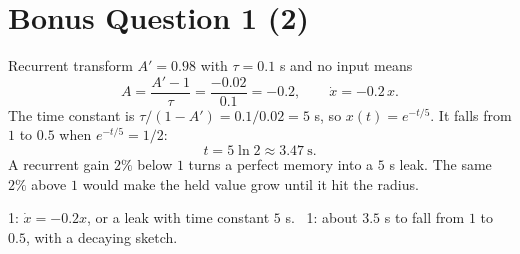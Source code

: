 \documentclass[11pt,letterpaper]{article}
\begin{document}
\section*{Bonus Question 1 \hfill (2)}
Recurrent transform $A' = 0.98$ with $\tau = 0.1$ s and no input means
\[
A = \frac{A' - 1}{\tau} = \frac{-0.02}{0.1} = -0.2,
\qquad \dot x = -0.2\,x.
\]
The time constant is $\tau/(1 - A') = 0.1/0.02 = 5$ s, so $x(t) = e^{-t/5}$. It falls from $1$ to $0.5$ when $e^{-t/5} = 1/2$:
\[
t = 5\ln 2 \approx \mathbf{3.47}\ \text{s}.
\]
A recurrent gain $2\%$ below $1$ turns a perfect memory into a $5$ s leak. The same $2\%$ above $1$ would make the held value grow until it hit the radius.
\begin{center}
\end{center}
\begin{marking}
1: $\dot x = -0.2x$, or a leak with time constant $5$ s. \ 1: about $3.5$ s to fall from $1$ to $0.5$, with a decaying sketch.
\end{marking}
\end{document}
